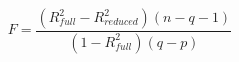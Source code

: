 \documentclass[10pt]{article}
\begin{document}
\[F = \frac{(R^2_{full}-R^2_{reduced})(n-q-1)}{(1-R^2_{full})(q-p)}\]
\end{document}
